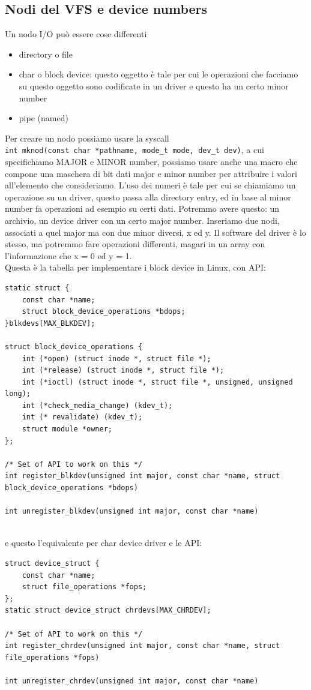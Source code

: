 \documentclass[12pt, oneside]{extbook}
\begin{document}
\subsection{Nodi del VFS e device numbers}
Un nodo I/O può essere cose differenti
\begin{itemize}
\item directory o file
\item char o block device: questo oggetto è tale per cui le operazioni che facciamo su questo oggetto sono codificate in un driver e questo ha un certo minor number
\item pipe (named)
\end{itemize}
Per creare un nodo possiamo usare la syscall\\ \texttt{int mknod(const char *pathname, mode\_t mode, dev\_t dev)}, a cui specifichiamo MAJOR e MINOR number, possiamo usare anche una macro che compone una maschera di bit dati major e minor number per attribuire i valori all'elemento che consideriamo. L'uso dei numeri è tale per cui se chiamiamo un operazione su un driver, questo passa alla directory entry, ed in base al minor number fa operazioni ad esempio su certi dati. Potremmo avere questo: un archivio, un device driver con un certo major number. Inseriamo due nodi, associati a quel major ma con due minor diversi, x ed y. Il software del driver è lo stesso, ma potremmo fare operazioni differenti, magari in un array con l'informazione che x = 0 ed y = 1.\\Questa è la tabella per implementare i block device in Linux, con API:
\begin{lstlisting}
static struct {
	const char *name;
	struct block_device_operations *bdops;
}blkdevs[MAX_BLKDEV];

struct block_device_operations {
	int (*open) (struct inode *, struct file *);
	int (*release) (struct inode *, struct file *);
	int (*ioctl) (struct inode *, struct file *, unsigned, unsigned long);
	int (*check_media_change) (kdev_t);
	int (* revalidate) (kdev_t);
	struct module *owner;
};

/* Set of API to work on this */
int register_blkdev(unsigned int major, const char *name, struct block_device_operations *bdops)

int unregister_blkdev(unsigned int major, const char *name)


\end{lstlisting}
e questo l'equivalente per char device driver e le API:
\begin{lstlisting}
struct device_struct {
	const char *name;
	struct file_operations *fops;
};
static struct device_struct chrdevs[MAX_CHRDEV];
	
/* Set of API to work on this */
int register_chrdev(unsigned int major, const char *name, struct file_operations *fops)
	
int unregister_chrdev(unsigned int major, const char *name)	
\end{lstlisting}
\end{document}
